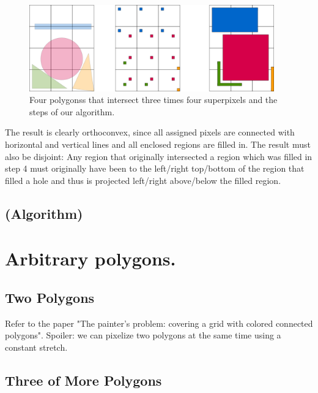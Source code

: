 \documentclass[a4paper, UKenglish]{lipics-v2018}
\begin{document}
\begin{figure}[H]
\centering
\includegraphics[width=400px]{Figures/convexprojection.png}
\caption{Four polygonss that intersect three times four superpixels and the steps of our algorithm.}
\label{fig:convexprojection}
\end{figure}

The result is clearly orthoconvex, since all assigned pixels are connected with horizontal and vertical lines and all enclosed regions are filled in. The result must also be disjoint: Any region that originally intersected a region which was filled in step 4 must originally have been to the left/right top/bottom of the region that filled a hole and thus is projected left/right above/below the filled region.



\subsection{(Algorithm)}
\label{sub:convex_algo}






\section{Arbitrary polygons.}
\label{sec:arbitrary}

\subsection{Two Polygons}

Refer to the paper "The painter’s problem: covering a grid with colored connected polygons".
Spoiler: we can pixelize two polygons at the same time using a constant stretch.

\subsection{Three of More Polygons}
\end{document}
